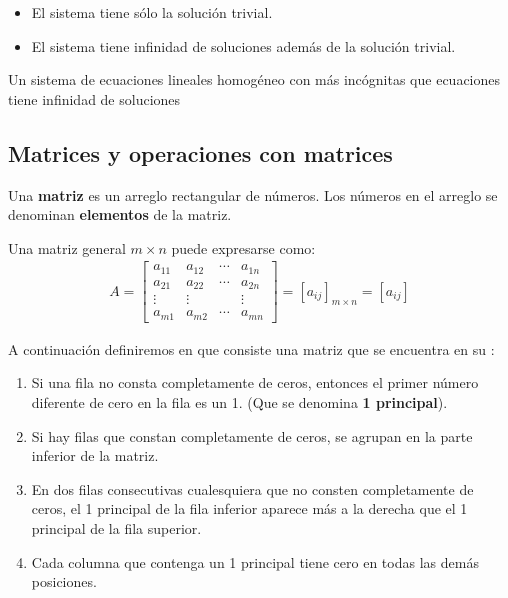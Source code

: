 \documentclass[a4paper,12pt]{article}
\begin{document}
\begin{concept}
  \begin{itemize}
    \item El sistema tiene sólo la solución trivial.
    \item El sistema tiene infinidad de soluciones además de la solución
      trivial.
  \end{itemize}
\end{concept}

\begin{theorem}
  Un sistema de ecuaciones lineales homogéneo con más incógnitas que
  ecuaciones tiene infinidad de soluciones
  \label{theo:1}
\end{theorem}

\subsection{Matrices y operaciones con matrices}

\begin{concept}[i]
  Una \textbf{matriz} es un arreglo rectangular de números. Los números en el arreglo
  se denominan \textbf{elementos} de la matriz.
\end{concept}

Una matriz general $m\times n$ puede expresarse como:
\begin{align*}
  A = \begin{bmatrix}
    a_{11}& a_{12}& \cdots& a_{1n}\\
    a_{21}& a_{22}& \cdots& a_{2n}\\
    \vdots&\vdots &       &\vdots \\
    a_{m1}& a_{m2}& \cdots& a_{mn}
  \end{bmatrix}
  = \left[ a_{ij} \right]_{m\times n} = \left[ a_{ij} \right]
\end{align*}

A continuación definiremos en que consiste una matriz que se encuentra en su
:
\begin{concept}[i]
  \begin{enumerate}
    \item Si una fila no consta completamente de ceros, entonces el primer
      número diferente de cero en la fila es un 1. (Que se denomina
      \textbf{1 principal}).
    \item Si hay filas que constan completamente de ceros, se agrupan en
      la parte inferior de la matriz.
    \item En dos filas consecutivas cualesquiera que no consten completamente
      de ceros, el 1 principal de la fila inferior aparece más a la derecha
      que el 1 principal de la fila superior.
    \item Cada columna que contenga un 1 principal tiene cero en todas las
      demás posiciones.
  \end{enumerate}
\end{concept}
\end{document}
